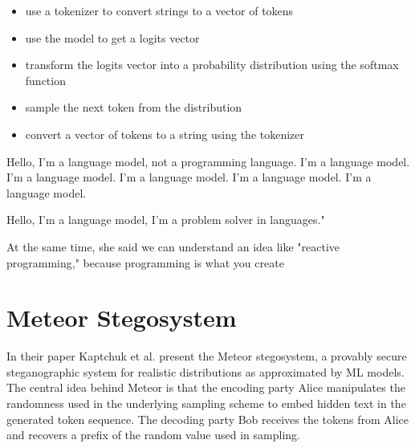 \begin{itemize}
	\item use a tokenizer to convert strings to a vector of tokens
	\item use the model to get a logits vector
	\item transform the logits vector into a probability distribution using the softmax function
	\item sample the next token from the distribution
	\item convert a vector of tokens to a string using the tokenizer
\end{itemize}








\begin{example}
	Hello, I'm a language model, not a programming language. I'm a language model. I'm a language model. I'm a language model. I'm a language model. I'm a language model.
	\label{example:gpt2-output}
\end{example}

\begin{example}
	Hello, I'm a language model, I'm a problem solver in languages."

	At the same time, she said we can understand an idea like "reactive programming," because programming is what you create
	\label{example:gpt2-output-sample}
\end{example}


\section{Meteor Stegosystem}
\label{sec:meteor}
In their paper \cite{Meteor2021} Kaptchuk et al. present the Meteor stegosystem, a provably secure steganographic system for realistic distributions as approximated by ML models.
The central idea behind Meteor is that the encoding party Alice manipulates the randomness used in the underlying sampling scheme to embed hidden text in the generated token sequence.
The decoding party Bob receives the tokens from Alice and recovers a prefix of the random value used in sampling.

